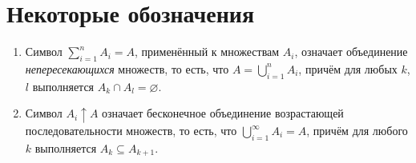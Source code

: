 \section*{Некоторые обозначения}
\label{sec:tos}
\begin{enumerate}
  \item Символ $ \sum_{i=1}^n A_i = A $, применённый к множествам $ A_i $,
    означает объединение \textsl{непересекающихся} множеств, то есть, что $ A =
    \bigcup_{i=1}^n A_i $, причём для любых $ k $, $ l $ выполняется $ A_k \cap
    A_l = \varnothing$.
  \item Символ $ A_i\uparrow A $ означает бесконечное объединение возрастающей
    последовательности множеств, то есть, что $ \bigcup\limits_{i=1}^\infty A_i
    = A$, причём для любого $ k $ выполняется $ A_k \subseteq A_{k+1} $.
\end{enumerate}

